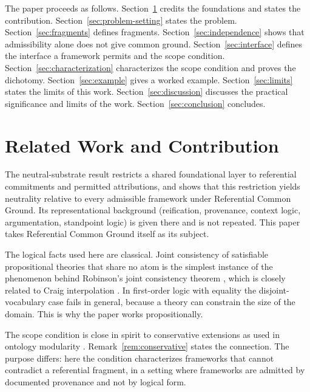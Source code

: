 \documentclass[11pt]{article}
\theoremstyle{plain}
\theoremstyle{definition}
\theoremstyle{remark}
\newcommand{\SecRef}[1]{Section~\ref{#1}}
\begin{document}
The paper proceeds as follows.
\SecRef{sec:related-work} credits the foundations and states the contribution.
\SecRef{sec:problem-setting} states the problem.
\SecRef{sec:fragments} defines fragments.
\SecRef{sec:independence} shows that admissibility alone does not give common ground.
\SecRef{sec:interface} defines the interface a framework permits and the scope condition.
\SecRef{sec:characterization} characterizes the scope condition and proves the dichotomy.
\SecRef{sec:example} gives a worked example.
\SecRef{sec:limits} states the limits of this work.
\SecRef{sec:discussion} discusses the practical significance and limits of the work.
\SecRef{sec:conclusion} concludes.

\section{Related Work and Contribution}
\label{sec:related-work}

The neutral-substrate result \citep{case2026neutral} restricts a shared
foundational layer to referential commitments and permitted attributions, and
shows that this restriction yields neutrality relative to every admissible
framework under Referential Common Ground.
Its representational background (reification, provenance, context logic,
argumentation, standpoint logic) is given there and is not repeated.
This paper takes Referential Common Ground itself as its subject.

The logical facts used here are classical.
Joint consistency of satisfiable propositional theories that share no atom is
the simplest instance of the phenomenon behind Robinson's joint consistency
theorem \citep{robinson1956}, which is closely related to Craig interpolation
\citep{craig1957}.
In first-order logic with equality the disjoint-vocabulary case fails in
general, because a theory can constrain the size of the domain.
This is why the paper works propositionally.

The scope condition is close in spirit to conservative extensions as used in
ontology modularity \citep{cuencagrau2008modular}.
Remark~\ref{rem:conservative} states the connection.
The purpose differs: here the condition characterizes frameworks that cannot
contradict a referential fragment, in a setting where frameworks are admitted by
documented provenance and not by logical form.
\end{document}
